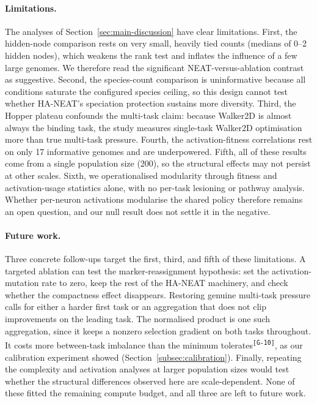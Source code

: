 \documentclass[12pt]{article}
\newcommand{\revID}[1]{\textsuperscript{\scriptsize\texttt{[#1]}}}
\newcommand{\revGram}[2]{\textcolor{lrRed}{#2}\revID{#1}}       %
\begin{document}
\paragraph{Limitations.}
The analyses of Section~\ref{sec:main-discussion} have clear limitations.
First, the hidden-node comparison rests on very small, heavily tied counts (medians of 0--2 hidden nodes), which weakens the rank test and inflates the influence of a few large genomes. We therefore read the significant NEAT-versus-ablation contrast as suggestive.
Second, the species-count comparison is uninformative because all conditions saturate the configured species ceiling, so this design cannot test whether HA-NEAT's speciation protection sustains more diversity.
Third, the Hopper plateau confounds the multi-task claim: because Walker2D is almost always the binding task, the study measures single-task Walker2D optimisation more than true multi-task pressure.
Fourth, the activation-fitness correlations rest on only 17 informative genomes and are underpowered.
Fifth, all of these results come from a single population size (200), so the structural effects may not persist at other scales.
Sixth, we operationalised modularity through fitness and activation-usage statistics alone, with no per-task lesioning or pathway analysis. Whether per-neuron activations modularise the shared policy therefore remains an open question, and our null result does not settle it in the negative.

\paragraph{Future work.}
Three concrete follow-ups target the first, third, and fifth of these limitations.
A targeted ablation can test the marker-reassignment hypothesis: set the activation-mutation rate to zero, keep the rest of the HA-NEAT machinery, and check whether the compactness effect disappears.
Restoring genuine multi-task pressure calls for either a harder first task or an aggregation that does not clip improvements on the leading task. The normalised product is one such aggregation, since it keeps a nonzero selection gradient on both tasks throughout. \revGram{G-10}{It costs more between-task imbalance than the minimum tolerates}, as our calibration experiment showed (Section~\ref{subsec:calibration}).
Finally, repeating the complexity and activation analyses at larger population sizes would test whether the structural differences observed here are scale-dependent.
None of these fitted the remaining compute budget, and all three are left to future work.


\clearpage \printbibliography
\end{document}
